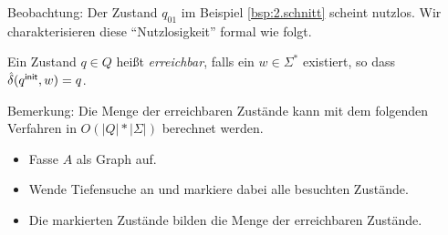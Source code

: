% 
% 

Beobachtung: Der Zustand $q_{01}$ im Beispiel \ref{bsp:2.schnitt} scheint nutzlos. Wir charakterisieren diese "`Nutzlosigkeit"' formal wie folgt.

\begin{Def}
  Ein Zustand $q \in Q$ heißt \emph{erreichbar}, falls ein $w \in \Sigma^*$ existiert, so dass $\hat \delta({q^\mathsf{init}}, w) = q$.
\end{Def}
Bemerkung: Die Menge der erreichbaren Zustände kann mit dem folgenden Verfahren in $O(|Q|*|\Sigma|)$ berechnet werden.
  \begin{itemize}
  \item Fasse $A$ als Graph auf.
  \item Wende Tiefensuche an und markiere dabei alle besuchten Zustände.
  \item Die markierten Zustände bilden die Menge der erreichbaren Zustände.
  \end{itemize}


